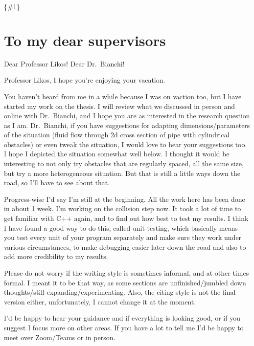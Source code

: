 \documentclass[
]{article}
\author{}
\date{}
\begin{document}
\newcommand{\matr}[1]\textbf

\{\#1\}

\newcommand{\vect}[1]{\vec{#1}}

\hypertarget{to-my-dear-supervisors}{%
\section{To my dear supervisors}\label{to-my-dear-supervisors}}

Dear Professor Likos! Dear Dr.~Bianchi!

Professor Likos, I hope you're enjoying your vacation.

You haven't heard from me in a while because I was on vaction too, but I
have started my work on the thesis. I will review what we discussed in
person and online with Dr.~Bianchi, and I hope you are as interested in
the research question as I am. Dr.~Bianchi, if you have suggestions for
adapting dimensions/parameters of the situation (fluid flow through 2d
cross section of pipe with cylindrical obstacles) or even tweak the
situation, I would love to hear your suggestions too. I hope I depicted
the situation somewhat well below. I thought it would be interesting to
not only try obstacles that are regularly spaced, all the same size, but
try a more heterogeneous situation. But that is still a little ways down
the road, so I'll have to see about that.

Progress-wise I'd say I'm still at the beginning. All the work here has
been done in about 1 week. I'm working on the collision step now. It
took a lot of time to get familiar with C++ again, and to find out how
best to test my results. I think I have found a good way to do this,
called unit testing, which basically means you test every unit of your
program separately and make sure they work under various circumstances,
to make debugging easier later down the road and also to add more
credibility to my results.

Please do not worry if the writing style is sometimes informal, and at
other times formal. I meant it to be that way, as some sections are
unfinished/jumbled down thoughts/still expanding/experimenting. Also,
the citing style is not the final version either, unfortunately, I
cannot change it at the moment.

I'd be happy to hear your guidance and if everything is looking good, or
if you suggest I focus more on other areas. If you have a lot to tell me
I'd be happy to meet over Zoom/Teams or in person.
\end{document}
